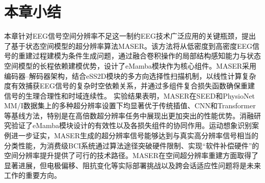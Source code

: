 \section{本章小结}
本章针对EEG信号空间分辨率不足这一制约EEG技术广泛应用的关键瓶颈，提出了基于状态空间模型的超分辨率算法MASER。该方法将从低密度到高密度EEG信号的重建过程建模为条件生成问题，通过融合卷积操作的局部结构感知能力与状态空间模型的长程依赖建模优势，设计了eMamba模块作为核心组件。MASER采用编码器--解码器架构，结合eSS2D模块的多方向选择性扫描机制，以线性计算复杂度有效捕获EEG信号的复杂时空依赖关系，并通过多组件复合损失函数确保重建信号的生理合理性和时域连续性。
实验结果表明，MASER在SEED和PhysioNet MM/I数据集上的多种超分辨率设置下均显著优于传统插值、CNN和Transformer等基线方法，特别是在高倍数超分辨率任务中展现出更加突出的性能优势。消融研究验证了eMamba模块设计的有效性以及各损失组件的协同作用。运动想象识别案例进一步证实，MASER生成的超分辨率信号能够达到与真实高分辨率信号相当的分类性能，为消费级BCI系统通过算法途径突破硬件限制、实现“软件补偿硬件”的空间分辨率提升提供了可行的技术路径。MASER在空间超分辨率重建方面取得了显著进展，但电极偏移、阻抗变化等实际部署挑战以及跨会话适应性问题将是未来工作的重要方向。

